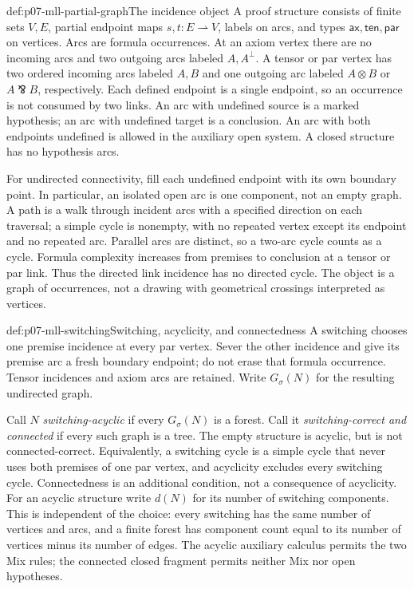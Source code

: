 \begin{hbdefinition}{def:p07-mll-partial-graph}{The incidence object}
A proof structure consists of finite sets \(V,E\), partial endpoint maps
\(s,t:E\rightharpoonup V\), labels on arcs, and types
\(\mathsf{ax},\mathsf{ten},\mathsf{par}\) on vertices.
Arcs are formula occurrences. At an axiom vertex there are no incoming
arcs and two outgoing arcs labeled \(A,A^\perp\). A tensor or par vertex
has two ordered incoming arcs labeled \(A,B\) and one outgoing arc
labeled \(A\otimes B\) or \(A\bindnasrepma B\), respectively.
Each defined endpoint is a single endpoint, so an occurrence is not
consumed by two links. An arc with undefined source is a marked
hypothesis; an arc with undefined target is a conclusion.
An arc with both endpoints undefined is allowed in the auxiliary open
system. A closed structure has no hypothesis arcs.

For undirected connectivity, fill each undefined endpoint with its own
boundary point. In particular, an isolated open arc is one component,
not an empty graph. A path is a walk through incident arcs with a
specified direction on each traversal; a simple cycle is nonempty,
with no repeated vertex except its endpoint and no repeated arc.
Parallel arcs are distinct, so a two-arc cycle counts as a cycle.
Formula complexity increases from premises to conclusion at a tensor
or par link. Thus the directed link incidence has no directed cycle.
The object is a graph of occurrences, not a drawing with geometrical
crossings interpreted as vertices.
\end{hbdefinition}

\begin{hbdefinition}{def:p07-mll-switching}{Switching, acyclicity, and connectedness}
A switching chooses one premise incidence at every par vertex. Sever
the other incidence and give its premise arc a fresh boundary endpoint;
do not erase that formula occurrence. Tensor incidences and axiom arcs
are retained. Write \(G_\sigma(N)\) for the resulting undirected graph.

Call \(N\) \emph{switching-acyclic} if every \(G_\sigma(N)\) is a forest.
Call it \emph{switching-correct and connected} if every such graph is a
tree. The empty structure is acyclic, but is not connected-correct.
Equivalently, a switching cycle is a simple cycle that never uses both
premises of one par vertex, and acyclicity excludes every switching cycle.
Connectedness is an additional condition, not a consequence of acyclicity.
For an acyclic structure write \(d(N)\) for its number of switching
components. This is independent of the choice: every switching has the
same number of vertices and arcs, and a finite forest has component
count equal to its number of vertices minus its number of edges.
The acyclic auxiliary calculus permits the two Mix rules; the connected
closed fragment permits neither Mix nor open hypotheses.
\end{hbdefinition}

